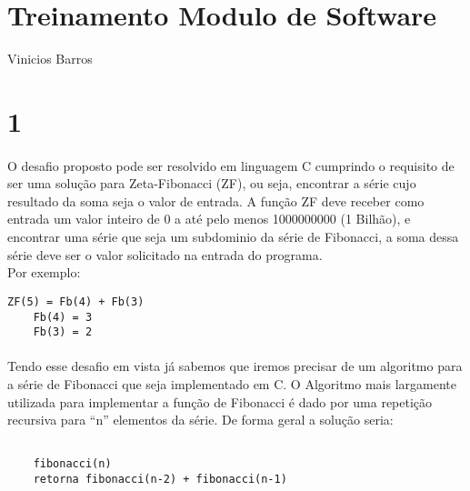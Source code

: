 \documentclass[10pt,a4paper]{article}
\begin{document}
{\centering{}
\section*{\huge{Treinamento Modulo de Software}}
Vinicios Barros \\
}

\section*{1}

{\raggedright{}	 %

	\paragraph{}
	O desafio proposto pode ser resolvido em linguagem C
	cumprindo o requisito de ser uma solução para 
	Zeta-Fibonacci (ZF), ou seja, encontrar	a série cujo 
	resultado da soma seja o valor de entrada.
	A função ZF deve receber como entrada um valor inteiro
	de 0 a até pelo menos 1000000000 (1 Bilhão), e encontrar
	uma série que seja um subdominio da série de Fibonacci,
	a soma dessa série deve ser o valor solicitado na 
	entrada do programa.\\
	Por exemplo:\\
\begin{Verbatim}[frame=single,
			framesep=3mm,
			xrightmargin=2cm]
	ZF(5) = Fb(4) + Fb(3)
	Fb(4) = 3
	Fb(3) = 2
\end{Verbatim}
	\paragraph{} 
	Tendo esse desafio em vista já sabemos que iremos precisar
	de um algoritmo para a série de Fibonacci que seja
	implementado em C. O Algoritmo mais largamente utilizada 
	para implementar a função de Fibonacci é dado por uma 
	repetição recursiva para ``n'' elementos da série. 
	De forma geral a solução seria: \\


\begin{Verbatim}[frame=single,
			framesep=3mm,
			xrightmargin=2cm]

	fibonacci(n)
	retorna fibonacci(n-2) + fibonacci(n-1)

\end{Verbatim}
}
\end{document}

